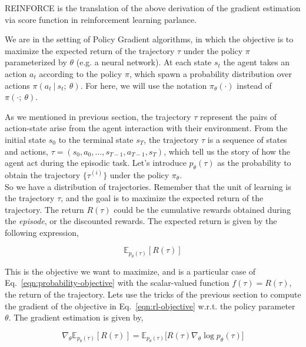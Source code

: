 REINFORCE \citep{williams1992simple} is the translation of the above derivation
of the gradient estimation via score function in reinforcement learning 
parlance.

We are in the setting of Policy Gradient algorithms, in which the objective is
to maximize the expected return of the trajectory $\tau$ under the policy 
$\pi$ parameterized by $\theta$ (e.g. a neural network). At each state
$s_t$ the agent takes an action $a_t$ according to the policy $\pi$,
which spawn a probability distribution over actions $\pi(a_{t}~|~s_{t};~\theta)$. For here, we will use the notation $\pi_{\theta}(\cdot)$ instead of 
$\pi(\cdot;~\theta)$.

As we mentioned in previous section, the trajectory $\tau$ represent the
pairs of action-state arise from the agent interaction with their environment. 
From the initial state $s_{0}$ to the terminal state $s_{T}$, the trajectory
$\tau$ is a sequence of states and actions, $\tau = (s_{0}, a_{0}, \dots, s_{T-1}, a_{T-1}, s_{T})$, which tell us the story of how the agent
act during the episodic task. Let's introduce $p_{\theta}(\tau)$ as the
probability to obtain the trajectory $\{\tau^{(i)}\}$ under the policy $\pi_{\theta}$. \\

So we have a distribution of trajectories. Remember that the unit of learning
is the trajectory $\tau$, and the goal is to maximize the expected return of the
trajectory. The return $R(\tau)$ could be the cumulative rewards obtained during the \textit{episode}, or the discounted rewards. The expected return is given by the following expression,

\begin{equation}\label{eqn:rl-objective}
    \mathbb{E}_{p_{\theta}(\tau)}[R(\tau)] 
\end{equation}

This is the objective we want to maximize, and is a 
particular case of Eq.~\ref{eqn:probability-objective} with the
scalar-valued function $f(\tau) = R(\tau)$, the return of the trajectory. 
Lets use the tricks of the previous section to compute the
gradient of the objective in Eq.~\ref{eqn:rl-objective} w.r.t. the policy
parameter $\theta$. The gradient estimation is given by,

\begin{equation}\label{eqn:rl-gradient-estimator-vanilla}
    \nabla_{\theta} \mathbb{E}_{p_{\theta}(\tau)}[R(\tau)] = \mathbb{E}_{p_{\theta}(\tau)}\big[R(\tau)\nabla_{\theta}\log p_{\theta}(\tau)\big]
\end{equation}    

